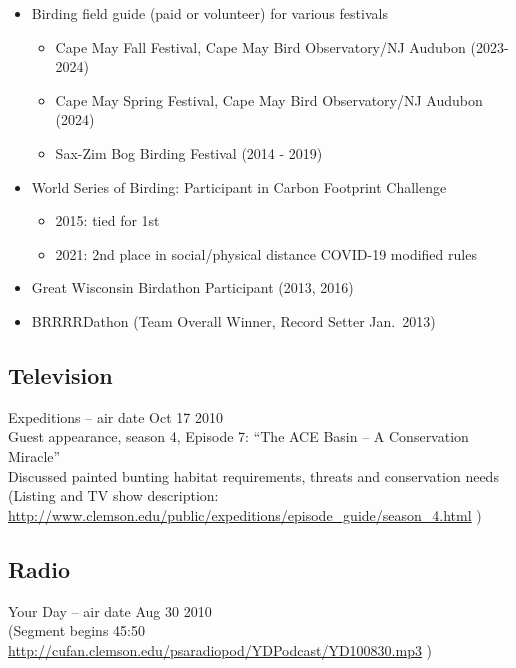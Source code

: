 \documentclass[11pt,a4paper,]{awesome-cv}
\providecommand{\tightlist}{%
	\setlength{\itemsep}{0pt}\setlength{\parskip}{0pt}}
\begin{document}
\begin{itemize}
\tightlist
\item
  Birding field guide (paid or volunteer) for various festivals

  \begin{itemize}
  \tightlist
  \item
    Cape May Fall Festival, Cape May Bird Observatory/NJ Audubon
    (2023-2024)
  \item
    Cape May Spring Festival, Cape May Bird Observatory/NJ Audubon
    (2024)
  \item
    Sax-Zim Bog Birding Festival (2014 - 2019)
  \end{itemize}
\item
  World Series of Birding: Participant in Carbon Footprint Challenge

  \begin{itemize}
  \tightlist
  \item
    2015: tied for 1st
  \item
    2021: 2nd place in social/physical distance COVID-19 modified rules
  \end{itemize}
\item
  Great Wisconsin Birdathon Participant (2013, 2016)
\item
  BRRRRDathon (Team Overall Winner, Record Setter Jan.~2013)
\end{itemize}

\subsection{Television}\label{television}

Expeditions -- air date Oct 17 2010\\
Guest appearance, season 4, Episode 7: ``The ACE Basin -- A Conservation
Miracle''\\
Discussed painted bunting habitat requirements, threats and conservation
needs\\
(Listing and TV show description:\\
\url{http://www.clemson.edu/public/expeditions/episode_guide/season_4.html}
)

\subsection{Radio}\label{radio}

Your Day -- air date Aug 30 2010\\
(Segment begins 45:50
\url{http://cufan.clemson.edu/psaradiopod/YDPodcast/YD100830.mp3} )
\end{document}
